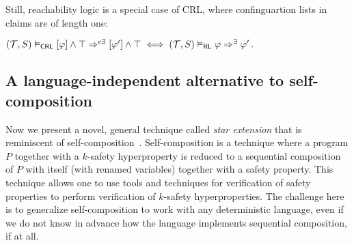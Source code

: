 Still, reachability logic is a special case of CRL, where confinguartion lists
in claims are of length one:
\begin{proposition}
  $ (\mathcal{T}, S) \vDash_{\mathsf{CRL}} [\varphi] \land \top \Rightarrow^{c\exists}
  [\varphi^\prime] \land \top \iff (\mathcal{T}, S) \vDash_{\mathsf{RL}} \varphi
  \Rightarrow^{\exists} \varphi^\prime \, .  $
\end{proposition}


\subsection{A language-independent alternative to self-composition}

Now we present a novel, general technique called \emph{star extension} that is reminiscent of self-composition~\cite{BartheDR11}.
Self-composition is a technique where a program $P$ together with a $k$-safety hyperproperty is reduced to
a sequential composition of $P$ with itself (with renamed variables) together with a safety property.
This technique allows one to use tools and techniques for verification of safety properties
to perform verification of $k$-safety hyperproperties.
The challenge here is to generalize self-composition to work with any deterministic language,
even if we do not know in advance how the language implements sequential composition, if at all.

